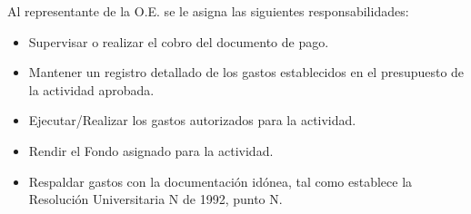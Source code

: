 Al representante de la O.E. se le asigna las siguientes responsabilidades:

\begin{itemize}
    \item Supervisar o realizar el cobro del documento de pago.
    \item Mantener un registro detallado de los gastos establecidos en el presupuesto de la actividad aprobada.
    \item Ejecutar/Realizar los gastos autorizados para la actividad.
    \item Rendir el Fondo asignado para la actividad.
    \item Respaldar gastos con la documentación idónea, tal como establece la Resolución Universitaria N de 1992, punto N. 
\end{itemize} 